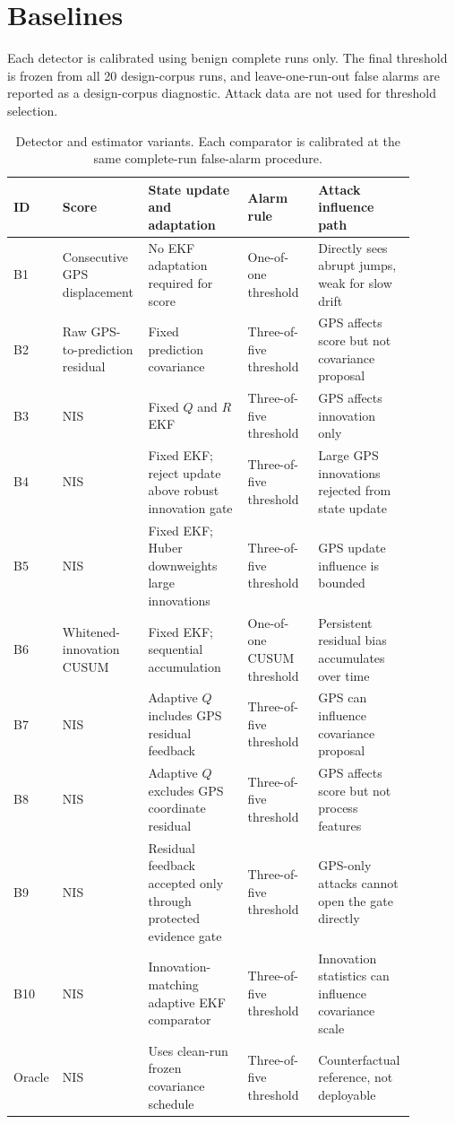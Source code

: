 \documentclass[conference]{IEEEtran}
\begin{document}
\section{Baselines}
\label{sec:baselines}

Each detector is calibrated using benign complete runs only. The final
threshold is frozen from all 20 design-corpus runs, and leave-one-run-out
false alarms are reported as a design-corpus diagnostic. Attack data are not
used for threshold selection.

\begin{table}[t]
\centering
\caption{Detector and estimator variants. Each comparator is calibrated at the same complete-run false-alarm procedure.}
\label{tab:baselines}
\scriptsize
\begin{tabular}{L{0.08\linewidth} L{0.18\linewidth} L{0.24\linewidth} L{0.17\linewidth} L{0.22\linewidth}}
\toprule
\textbf{ID} & \textbf{Score} & \textbf{State update and adaptation} & \textbf{Alarm rule} & \textbf{Attack influence path} \\
\midrule
B1 & Consecutive GPS displacement & No EKF adaptation required for score & One-of-one threshold & Directly sees abrupt jumps, weak for slow drift \\
B2 & Raw GPS-to-prediction residual & Fixed prediction covariance & Three-of-five threshold & GPS affects score but not covariance proposal \\
B3 & NIS & Fixed $Q$ and $R$ EKF & Three-of-five threshold & GPS affects innovation only \\
B4 & NIS & Fixed EKF; reject update above robust innovation gate & Three-of-five threshold & Large GPS innovations rejected from state update \\
B5 & NIS & Fixed EKF; Huber downweights large innovations & Three-of-five threshold & GPS update influence is bounded \\
B6 & Whitened-innovation CUSUM & Fixed EKF; sequential accumulation & One-of-one CUSUM threshold & Persistent residual bias accumulates over time \\
B7 & NIS & Adaptive $Q$ includes GPS residual feedback & Three-of-five threshold & GPS can influence covariance proposal \\
B8 & NIS & Adaptive $Q$ excludes GPS coordinate residual & Three-of-five threshold & GPS affects score but not process features \\
B9 & NIS & Residual feedback accepted only through protected evidence gate & Three-of-five threshold & GPS-only attacks cannot open the gate directly \\
B10 & NIS & Innovation-matching adaptive EKF comparator & Three-of-five threshold & Innovation statistics can influence covariance scale \\
Oracle & NIS & Uses clean-run frozen covariance schedule & Three-of-five threshold & Counterfactual reference, not deployable \\
\bottomrule
\end{tabular}
\end{table}
\end{document}
